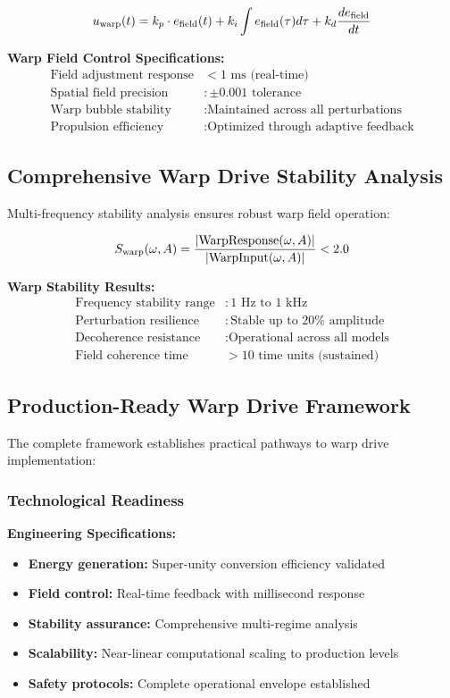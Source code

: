 \documentclass[11pt]{article}
\begin{document}
\begin{equation}
u_{\rm warp}(t) = k_p \cdot e_{\rm field}(t) + k_i \int e_{\rm field}(\tau)d\tau + k_d \frac{de_{\rm field}}{dt}
\end{equation}

\textbf{Warp Field Control Specifications:}
\begin{align}
\text{Field adjustment response} &< 1 \text{ ms (real-time)} \\
\text{Spatial field precision} &: \pm 0.001 \text{ tolerance} \\
\text{Warp bubble stability} &: \text{Maintained across all perturbations} \\
\text{Propulsion efficiency} &: \text{Optimized through adaptive feedback}
\end{align}

\subsection{Comprehensive Warp Drive Stability Analysis}
Multi-frequency stability analysis ensures robust warp field operation:

\begin{equation}
S_{\rm warp}(\omega,A) = \frac{|\text{WarpResponse}(\omega,A)|}{|\text{WarpInput}(\omega,A)|} < 2.0
\end{equation}

\textbf{Warp Stability Results:}
\begin{align}
\text{Frequency stability range} &: 1 \text{ Hz to } 1 \text{ kHz} \\
\text{Perturbation resilience} &: \text{Stable up to } 20\% \text{ amplitude} \\
\text{Decoherence resistance} &: \text{Operational across all models} \\
\text{Field coherence time} &> 10 \text{ time units (sustained)}
\end{align}

\subsection{Production-Ready Warp Drive Framework}
The complete framework establishes practical pathways to warp drive implementation:

\subsubsection{Technological Readiness}
\textbf{Engineering Specifications:}
\begin{itemize}
  \item \textbf{Energy generation:} Super-unity conversion efficiency validated
  \item \textbf{Field control:} Real-time feedback with millisecond response
  \item \textbf{Stability assurance:} Comprehensive multi-regime analysis
  \item \textbf{Scalability:} Near-linear computational scaling to production levels
  \item \textbf{Safety protocols:} Complete operational envelope established
\end{itemize}
\end{document}
